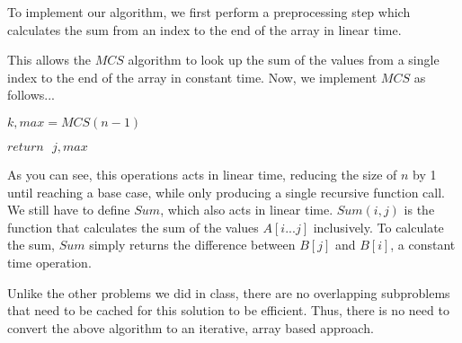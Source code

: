 \documentclass[12pt]{article}
\begin{document}
To implement our algorithm, we first perform a preprocessing step which calculates the sum from an index to the end of the array in linear time. \\

\begin{algorithm}[H]
\BlankLine

\end{algorithm}

This allows the $MCS$ algorithm to look up the sum of the values from a single index to the end of the array in constant time.
Now, we implement $MCS$ as follows... \\

\begin{algorithm}[H]
\BlankLine
	$k, max = MCS(n-1)$
	
	$return \text{ } j, max$
\end{algorithm}

As you can see, this operations acts in linear time, reducing the size of $n$ by 1 until reaching a base case, while only producing a single recursive function call. We still have to define $Sum$, which also acts in linear time. $Sum(i, j)$ is the function that calculates the sum of the values $A[i...j]$ inclusively. To calculate the sum, $Sum$ simply returns the difference between $B[j]$ and $B[i]$, a constant time operation.

Unlike the other problems we did in class, there are no overlapping subproblems that need to be cached for this solution to be efficient. Thus, there is no need to convert the above algorithm to an iterative, array based approach.
\end{document}
